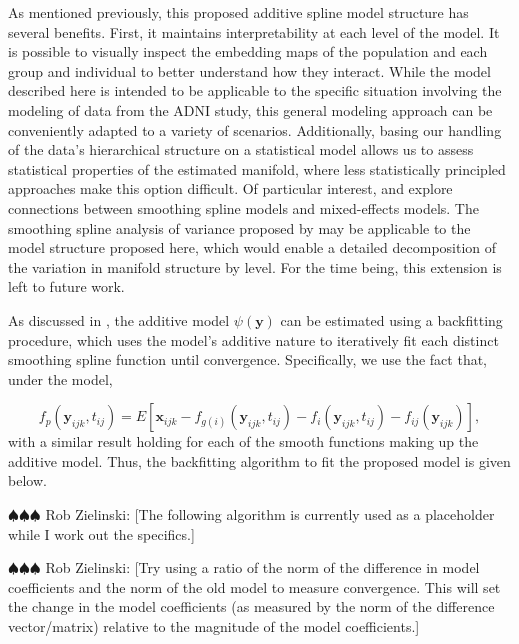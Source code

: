 \documentclass[11pt,reqno]{article}
\newcommand{\zielinski}[1]{{\color{blue} \sf $\spadesuit\spadesuit\spadesuit$ Rob Zielinski: [#1]}}
\theoremstyle{definition}
\begin{document}
As mentioned previously, this proposed additive spline model structure has several benefits. First, it maintains interpretability at each level of the model. It is possible to visually inspect the embedding maps of the population and each group and individual to better understand how they interact. While the model described here is intended to be applicable to the specific situation involving the modeling of data from the ADNI study, this general modeling approach can be conveniently adapted to a variety of scenarios. Additionally, basing our handling of the data's hierarchical structure on a statistical model allows us to assess statistical properties of the estimated manifold, where less statistically principled approaches make this option difficult. Of particular interest, \cite{wangMixedEffectsSmoothing1998} and \cite{brumbackSmoothingSplineModels1998} explore connections between smoothing spline models and mixed-effects models. The smoothing spline analysis of variance proposed by \cite{wangMixedEffectsSmoothing1998} may be applicable to the model structure proposed here, which would enable a detailed decomposition of the variation in manifold structure by level. For the time being, this extension is left to future work.

As discussed in \cite{hastieGeneralizedAdditiveModels1990}, the additive model $\psi(\mathbf{y})$ can be estimated using a backfitting procedure, which uses the model's additive nature to iteratively fit each distinct smoothing spline function until convergence. Specifically, we use the fact that, under the model,

\[%
f_p(\mathbf{y}_{ijk}, t_{ij}) = E\left[\mathbf{x}_{ijk} - f_{g(i)}(\mathbf{y}_{ijk}, t_{ij}) - f_{i}(\mathbf{y}_{ijk}, t_{ij}) - f_{ij}(\mathbf{y}_{ijk})\right]
,\]%
with a similar result holding for each of the smooth functions making up the additive model. Thus, the backfitting algorithm to fit the proposed model is given below.

\zielinski{The following algorithm is currently used as a placeholder while I work out the specifics.}

\zielinski{Try using a ratio of the norm of the difference in model coefficients and the norm of the old model to measure convergence. This will set the change in the model coefficients (as measured by the norm of the difference vector/matrix) relative to the magnitude of the model coefficients.}
\end{document}
